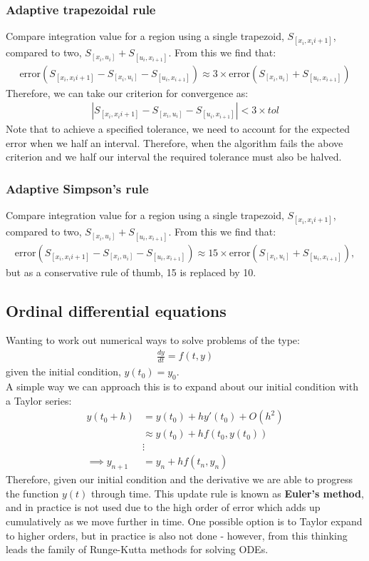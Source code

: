 \documentclass[11pt,a4paper]{report}
\begin{document}
	\subsubsection{Adaptive trapezoidal rule}
	Compare integration value for a region using a single trapezoid, $S_{[x_i,x_i{i+1}]}$, compared to two, $S_{[x_i,u_i]} + S_{[u_i,x_{i+1}]}$. From this we find that:
	\begin{align}
	\text{error}(S_{[x_i,x_i{i+1}]} - S_{[x_i,u_i]} - S_{[u_i,x_{i+1}]}) \approx 3\times \text{error} (S_{[x_i,u_i]} + S_{[u_i,x_{i+1}]})
	\end{align}
	Therefore, we can take our criterion for convergence as:
	\begin{align}
	| S_{[x_i,x_i{i+1}]} - S_{[x_i,u_i]} - S_{[u_i,x_{i+1}]} | < 3\times tol
	\end{align}
	Note that to achieve a specified tolerance, we need to account for the expected error when we half an interval. Therefore, when the algorithm fails the above criterion and we half our interval the required tolerance must also be halved.
	
	\subsubsection{Adaptive Simpson's rule}
	Compare integration value for a region using a single trapezoid, $S_{[x_i,x_i{i+1}]}$, compared to two, $S_{[x_i,u_i]} + S_{[u_i,x_{i+1}]}$. From this we find that:
	\begin{align}
	\text{error}(S_{[x_i,x_i{i+1}]} - S_{[x_i,u_i]} - S_{[u_i,x_{i+1}]}) \approx 15\times \text{error} (S_{[x_i,u_i]} + S_{[u_i,x_{i+1}]}),
	\end{align}
	but as a conservative rule of thumb, 15 is replaced by 10.
	
	\subsection{Ordinal differential equations}
	Wanting to work out numerical ways to solve problems of the type:
	\begin{align}
	\frac{dy}{dt} = f(t,y)
	\end{align}
	given the initial condition, $y(t_0)=y_0$. \\
	
	A simple way we can approach this is to expand about our initial condition with a Taylor series:
	\begin{align}
	y(t_0 + h) &= y(t_0) + hy'(t_0) + O(h^2) \\
	&\approx y(t_0) + h f(t_0, y(t_0)) \\
	&\vdots \\
	\implies y_{n+1} &= y_n + hf(t_n, y_n)
	\end{align}
	Therefore, given our initial condition and the derivative we are able to progress the function $y(t)$ through time. This update rule is known as \textbf{Euler's method}, and in practice is not used due to the high order of error which adds up cumulatively as we move further in time. One possible option is to Taylor expand to higher orders, but in practice is also not done - however, from this thinking leads the family of Runge-Kutta methods for solving ODEs.
	
\end{document}
